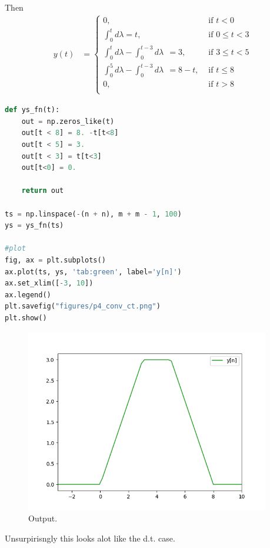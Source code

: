 Then 
\begin{align}
    y(t) &= \begin{cases}
    0, &\text{ if }t<0\\
    \int_0^t d\lambda = t, &\text{ if }0\leq t<3\\
        \int_0^t d\lambda  - \int_0^{t-3} d\lambda 
            \ \ = 3, &\text{ if }3\leq t<5\\
        \int_0^5 d\lambda  - \int_0^{t -3} d\lambda \ \ 
            = 8 - t, &\text{ if }t\leq 8\\
    0, &\text{ if }t >8\\
\end{cases}
\end{align}


\begin{lstlisting}[language=python]
def ys_fn(t):
    out = np.zeros_like(t)
    out[t < 8] = 8. -t[t<8]
    out[t < 5] = 3.
    out[t < 3] = t[t<3]
    out[t<0] = 0.

    return out

ts = np.linspace(-(n + n), m + m - 1, 100)
ys = ys_fn(ts)

#plot 
fig, ax = plt.subplots()
ax.plot(ts, ys, 'tab:green', label='y[n]')
ax.set_xlim([-3, 10])
ax.legend()
plt.savefig("figures/p4_conv_ct.png")
plt.show()
\end{lstlisting}

\clearpage

\begin{figure}[h!]
    \begin{center}
        \includegraphics[width=0.95\textwidth]{figures/p4_conv_ct.png}
    \end{center}
    \caption{Output.}
\end{figure}

Unsurpirisngly this looks alot like the d.t. case.

